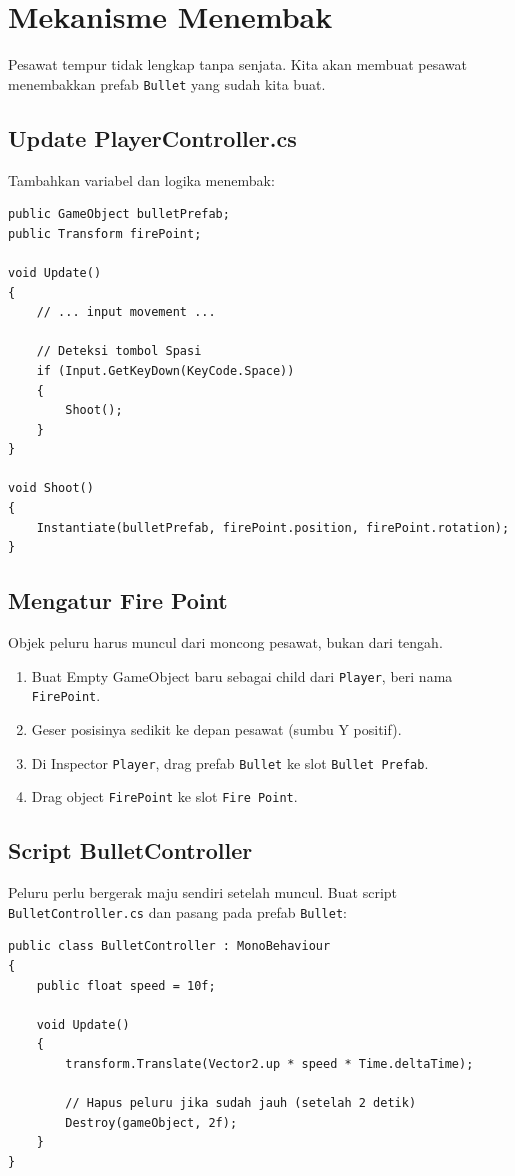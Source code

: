 
\section{Mekanisme Menembak}

Pesawat tempur tidak lengkap tanpa senjata. Kita akan membuat pesawat menembakkan prefab \texttt{Bullet} yang sudah kita buat.

\subsection{Update PlayerController.cs}

Tambahkan variabel dan logika menembak:

\begin{lstlisting}[language={[Sharp]C}]
public GameObject bulletPrefab;
public Transform firePoint;

void Update()
{
    // ... input movement ...

    // Deteksi tombol Spasi
    if (Input.GetKeyDown(KeyCode.Space))
    {
        Shoot();
    }
}

void Shoot()
{
    Instantiate(bulletPrefab, firePoint.position, firePoint.rotation);
}
\end{lstlisting}

\subsection{Mengatur Fire Point}
Objek peluru harus muncul dari moncong pesawat, bukan dari tengah.
\begin{enumerate}
    \item Buat Empty GameObject baru sebagai child dari \texttt{Player}, beri nama \texttt{FirePoint}.
    \item Geser posisinya sedikit ke depan pesawat (sumbu Y positif).
    \item Di Inspector \texttt{Player}, drag prefab \texttt{Bullet} ke slot \texttt{Bullet Prefab}.
    \item Drag object \texttt{FirePoint} ke slot \texttt{Fire Point}.
\end{enumerate}

\subsection{Script BulletController}
Peluru perlu bergerak maju sendiri setelah muncul. Buat script \texttt{BulletController.cs} dan pasang pada prefab \texttt{Bullet}:

\begin{lstlisting}[language={[Sharp]C}]
public class BulletController : MonoBehaviour
{
    public float speed = 10f;

    void Update()
    {
        transform.Translate(Vector2.up * speed * Time.deltaTime);
        
        // Hapus peluru jika sudah jauh (setelah 2 detik)
        Destroy(gameObject, 2f); 
    }
}
\end{lstlisting}
